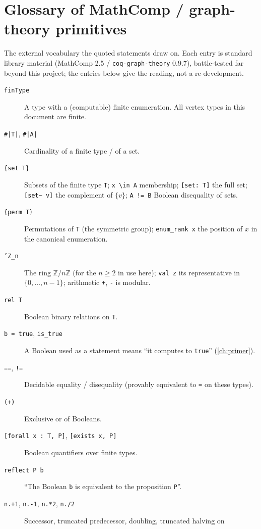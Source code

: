 \chapter{Glossary of MathComp / graph-theory primitives}
\label{ch:glossary}

The external vocabulary the quoted statements draw on. Each entry is
standard library material (MathComp 2.5 / \texttt{coq-graph-theory}
0.9.7), battle-tested far beyond this project; the entries below give
the reading, not a re-development.

\begin{description}
\item[\texttt{finType}] A type with a (computable) finite
  enumeration. All vertex types in this document are finite.
\item[\texttt{\#|T|}, \texttt{\#|A|}] Cardinality of a finite
  type / of a set.
\item[\texttt{\{set T\}}] Subsets of the finite type \texttt{T};
  \texttt{x \textbackslash in A} membership; \texttt{[set: T]} the
  full set; \texttt{[set\textasciitilde{} v]} the complement of
  $\{v\}$; \texttt{A != B} Boolean disequality of sets.
\item[\texttt{\{perm T\}}] Permutations of \texttt{T} (the symmetric
  group); \texttt{enum\_rank x} the position of $x$ in the canonical
  enumeration.
\item[\texttt{'Z\_n}] The ring $\mathbb{Z}/n\mathbb{Z}$ (for the
  $n \ge 2$ in use here); \texttt{val z} its representative in
  $\{0, \dots, n-1\}$; arithmetic \texttt{+}, \texttt{-} is modular.
\item[\texttt{rel T}] Boolean binary relations on \texttt{T}.
\item[\texttt{b = true}, \texttt{is\_true}] A Boolean used as a
  statement means ``it computes to \texttt{true}''
  (\cref{ch:primer}).
\item[\texttt{==}, \texttt{!=}] Decidable equality / disequality
  (provably equivalent to \texttt{=} on these types).
\item[\texttt{(+)}] Exclusive or of Booleans.
\item[{\texttt{[forall x : T, P]}, \texttt{[exists x, P]}}]
  Boolean quantifiers over finite types.
\item[\texttt{reflect P b}] ``The Boolean \texttt{b} is equivalent to
  the proposition \texttt{P}''.
\item[\texttt{n.+1}, \texttt{n.-1}, \texttt{n.*2}, \texttt{n./2}]
  Successor, truncated predecessor, doubling, truncated halving on

\end{description}
